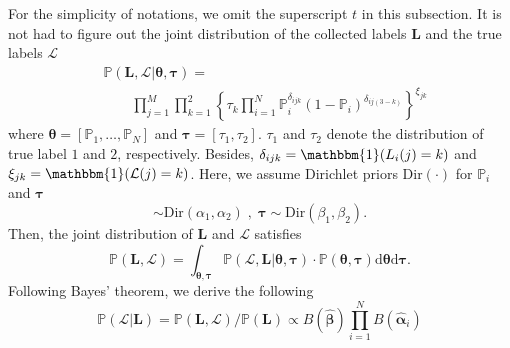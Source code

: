  For the simplicity of notations, we omit the superscript $t$ in this subsection.  %
It is not had to figure out the joint distribution of the collected labels $\bm{L}$ and the true labels $\mathcal{L}$ 
\begin{equation*}
\label{JointDist}
\begin{split}
    &\mathbb{P}(\bm{L}, \mathcal{L}| \bm{\theta}, \bm{\tau})=\\ &\qquad {\prod}_{j=1}^{M}{\prod}_{k=1}^{2}\left\{\tau_{k}\prod_{i=1}^{N}\mathbb{P}_i^{\delta_{ijk}}(1-\mathbb{P}_i)^{\delta_{ij(3-k)}} \right\}^{\xi_{jk}}
\end{split}
\end{equation*}
where $\bm{\theta}=[\mathbb{P}_1,\ldots, \mathbb{P}_N]$ and $\bm{\tau}=[\tau_1,\tau_2]$. $\tau_1$ and $\tau_2$ denote the distribution of true label $1$ and $2$, respectively.
Besides,  $\delta_{ijk}=\mathbbm{1}(L_i(j)=k)$ and $\xi_{jk}= \mathbbm{1}(\mathcal{L}(j)=k)$.
Here, we assume Dirichlet priors $\textrm{Dir}(\cdot)$ for $\mathbb{P}_i$ and $\bm{\tau}$
\begin{equation*}
[\mathbb{P}_{i}, 1-\mathbb{P}_i]\sim \textrm{Dir}(\alpha_{1},\alpha_{2})\;,\; \bm{\tau}\sim \textrm{Dir}(\beta_{1},\beta_{2}).
\end{equation*}
Then, the joint distribution of $\bm{L}$ and $\mathcal{L}$ satisfies
\begin{equation*}
\label{JointDist2}
\mathbb{P}(\bm{L},\mathcal{L})={\int}_{\bm{\theta},\bm{\tau}}\mathbb{P}(\mathcal{L},\bm{L}|\bm{\theta}, \bm{\tau})\cdot \mathbb{P}(\bm{\theta}, \bm{\tau})\mathrm{d}\bm{\theta}\mathrm{d}\bm{\tau}.
\end{equation*}
Following Bayes' theorem, we derive the following
\begin{equation}
\label{PostDist}
\mathbb{P}(\mathcal{L}|\bm{L})=\mathbb{P}(\bm{L},\mathcal{L})/\mathbb{P}(\bm{L})\propto B(\hat{\bm{\beta}}){\prod}_{i=1}^{N}B(\hat{\bm{\alpha}}_{i}) 
\end{equation}
%
